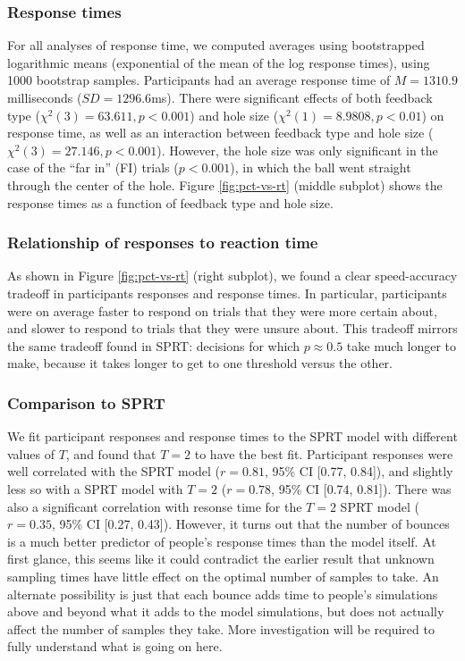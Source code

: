 \documentclass[11pt]{article}
\begin{document}
\subsubsection{Response times}

For all analyses of response time, we computed averages using bootstrapped logarithmic means (exponential of the mean of the log response times), using 1000 bootstrap samples. Participants had an average response time of $M=1310.9$ milliseconds ($SD=1296.6$ms). There were significant effects of both feedback type ($\chi^2(3)=63.611, p<0.001$) and hole size ($\chi^2(1)=8.9808, p<0.01$) on response time, as well as an interaction between feedback type and hole size ($\chi^2(3)=27.146, p<0.001$). However, the hole size was only significant in the case of the ``far in'' (FI) trials ($p<0.001$), in which the ball went straight through the center of the hole. Figure \ref{fig:pct-vs-rt} (middle subplot) shows the response times as a function of feedback type and hole size.

\subsubsection{Relationship of responses to reaction time}

As shown in Figure \ref{fig:pct-vs-rt} (right subplot), we found a clear speed-accuracy tradeoff in participants responses and response times. In particular, participants were on average faster to respond on trials that they were more certain about, and slower to respond to trials that they were unsure about. This tradeoff mirrors the same tradeoff found in SPRT: decisions for which $p\approx0.5$ take much longer to make, because it takes longer to get to one threshold versus the other.

\subsubsection{Comparison to SPRT}

We fit participant responses and response times to the SPRT model with different values of $T$, and found that $T=2$ to have the best fit. Participant responses were well correlated with the SPRT model ($r=0.81$, 95\% CI [0.77, 0.84]), and slightly less so with a SPRT model with $T=2$ ($r=0.78$, 95\% CI [0.74, 0.81]). There was also a significant correlation with resonse time for the $T=2$ SPRT model ($r=0.35$, 95\% CI [0.27, 0.43]). However, it turns out that the number of bounces is a much better predictor of people's response times than the model itself. At first glance, this seems like it could contradict the earlier result that unknown sampling times have little effect on the optimal number of samples to take. An alternate possibility is just that each bounce adds time to people's simulations above and beyond what it adds to the model simulations, but does not actually affect the number of samples they take. More investigation will be required to fully understand what is going on here.
\end{document}
